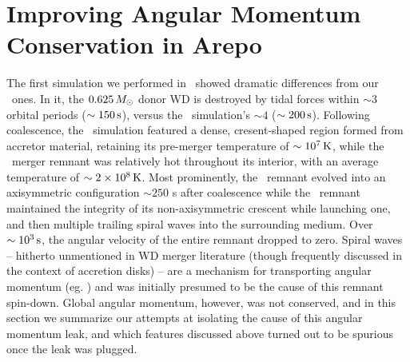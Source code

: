 \section{Improving Angular Momentum Conservation in Arepo}
\label{sec:c3_fixingarepo}

The first simulation we performed in \arepo\ showed dramatic differences from our \gasoline\ ones.  In it, the $0.625\,\Msun$ donor WD is destroyed by tidal forces within $\sim3$ orbital periods ($\sim150\,\mathrm{s}$), versus the \gasoline\ simulation's $\sim4$ ($\sim200\,\mathrm{s}$).  Following coalescence, the \arepo\ simulation featured a dense, cresent-shaped region formed from accretor material, retaining its pre-merger temperature of $\sim10^7\,\mathrm{K}$, while the \gasoline\ merger remnant was relatively hot throughout its interior, with an average temperature of $\sim2\times10^8\,\mathrm{K}$.  Most prominently, the \gasoline\ remnant evolved into an axisymmetric configuration $\sim250$ s after coalescence while the \arepo\ remnant maintained the integrity of its non-axisymmetric crescent while launching one, and then multiple trailing spiral waves into the surrounding medium.  Over $\sim10^3\,\mathrm{s}$, the angular velocity of the entire remnant dropped to zero.  Spiral waves -- hitherto unmentioned in WD merger literature (though frequently discussed in the context of accretion disks) -- are a mechanism for transporting angular momentum (eg. \citealt{papal95, balb03}) and was initially presumed to be the cause of this remnant spin-down.  Global angular momentum, however, was not conserved, and in this section we summarize our attempts at isolating the cause of this angular momentum leak, and which features discussed above turned out to be spurious once the leak was plugged.

